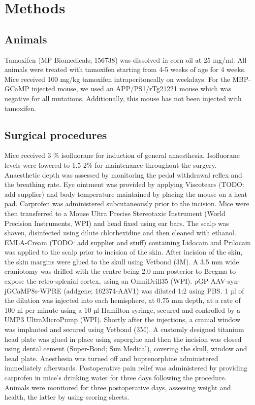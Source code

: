 \chapter{Methods}
\label{ch:4-methods}

\minitoc

\section{Animals}
Tamoxifen (MP Biomedicals; 156738) was dissolved in corn oil at 25 mg/ml. All animals were treated with tamoxifen starting from 4-5 weeks of age for 4 weeks. Mice received 100 mg/kg tamoxifen intraperitoneally on weekdays.
For the MBP-GCaMP injected mouse, we used an APP/PS1/rTg21221 mouse which was negative for all mutations. Additionally, this mouse has not been injected with tamoxifen.
\section{Surgical procedures}
Mice received 3 \% isofluorane for induction of general anaesthesia. Isofluorane levels were lowered to 1.5-2\% for maintenance throughout the surgery. Anaesthetic depth was assessed by monitoring the pedal withdrawal reflex and the breathing rate. Eye ointment was provided by applying Viscotears (TODO: add supplier) and body temperature maintained by placing the mouse on a heat pad. Carprofen was administered subcutaneously prior to the incision. Mice were then transferred to a Mouse Ultra Precise Stereotaxic Instrument (World Precision Instruments, WPI) and head fixed using ear bars. The scalp was shaven, disinfected using dilute chlorhexidine and then cleaned with ethanol.  EMLA-Cream (TODO: add supplier and stuff) containing Lidocain and Prilocain was applied to the scalp prior to incision of the skin. After incision of the skin, the skin margins were glued to the skull using Vetbond (3M).
A 3.5 mm wide craniotomy was drilled  with the centre being 2.0 mm posterior to Bregma to expose the retro-splenial cortex, using an OmniDrill35 (WPI).
pGP-AAV-syn-jGCaMP8s-WPRE (addgene; 162374-AAV1) was diluted 1:2 using PBS. 1 µl of the dilution was injected into each hemisphere, at 0.75 mm depth, at a rate of 100 nl per minute using a 10 µl Hamilton syringe, secured and controlled by a UMP3 UltraMicroPump (WPI).
Shortly after the injections, a cranial window was implanted and secured using Vetbond (3M). A customly designed titanium head plate was glued in place using superglue and then the incision was closed using dental cement (Super-Bond; Sun Medical), covering the skull, window and head plate.
Anesthesia was turned off and buprenorphine administered immediately afterwards. Postoperative pain relief was administered by providing carprofen in mice's drinking water for three days following the procedure. Animals were monitored for three postoperative days, assessing weight and health, the latter by using scoring sheets.

